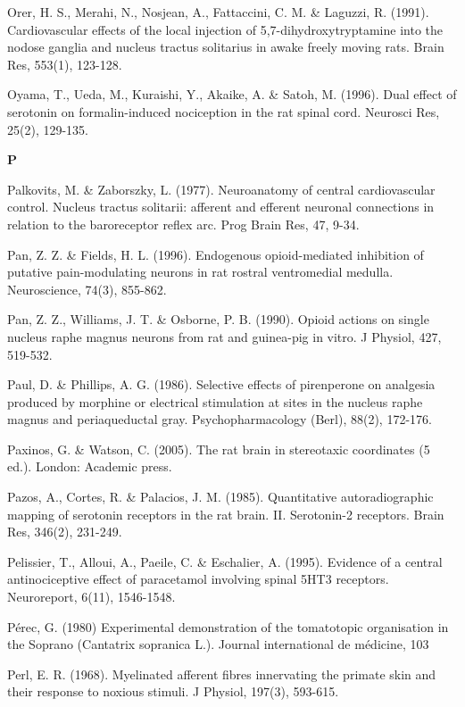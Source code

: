 \documentclass[a4paper,12pt,twoside]{report}
\begin{document}
\begin{singlespacing}
\begin{footnotesize}
Orer, H. S., Merahi, N., Nosjean, A., Fattaccini, C. M. \& Laguzzi, R. (1991). Cardiovascular effects of the local injection of 5,7-dihydroxytryptamine into the nodose ganglia and nucleus tractus solitarius in awake freely moving rats. Brain Res, 553(1), 123-128.

Oyama, T., Ueda, M., Kuraishi, Y., Akaike, A. \& Satoh, M. (1996). Dual effect of serotonin on formalin-induced nociception in the rat spinal cord. Neurosci Res, 25(2), 129-135.

\medskip
\begin{Large}\textbf{P}\end{Large}

Palkovits, M. \& Zaborszky, L. (1977). Neuroanatomy of central cardiovascular control. Nucleus tractus solitarii: afferent and efferent neuronal connections in relation to the baroreceptor reflex arc. Prog Brain Res, 47, 9-34.

Pan, Z. Z. \& Fields, H. L. (1996). Endogenous opioid-mediated inhibition of putative pain-modulating neurons in rat rostral ventromedial medulla. Neuroscience, 74(3), 855-862.

Pan, Z. Z., Williams, J. T. \& Osborne, P. B. (1990). Opioid actions on single nucleus raphe magnus neurons from rat and guinea-pig in vitro. J Physiol, 427, 519-532.

Paul, D. \& Phillips, A. G. (1986). Selective effects of pirenperone on analgesia produced by morphine or electrical stimulation at sites in the nucleus raphe magnus and periaqueductal gray. Psychopharmacology (Berl), 88(2), 172-176.

Paxinos, G. \& Watson, C. (2005). The rat brain in stereotaxic coordinates (5 ed.). London: Academic press.

Pazos, A., Cortes, R. \& Palacios, J. M. (1985). Quantitative autoradiographic mapping of serotonin receptors in the rat brain. II. Serotonin-2 receptors. Brain Res, 346(2), 231-249.

Pelissier, T., Alloui, A., Paeile, C. \& Eschalier, A. (1995). Evidence of a central antinociceptive effect of paracetamol involving spinal 5HT3 receptors. Neuroreport, 6(11), 1546-1548.

Pérec, G. (1980) Experimental demonstration of the tomatotopic organisation in the Soprano (Cantatrix sopranica L.). Journal international de médicine, 103

Perl, E. R. (1968). Myelinated afferent fibres innervating the primate skin and their response to noxious stimuli. J Physiol, 197(3), 593-615.


\end{footnotesize}
\end{singlespacing}
\end{document}
